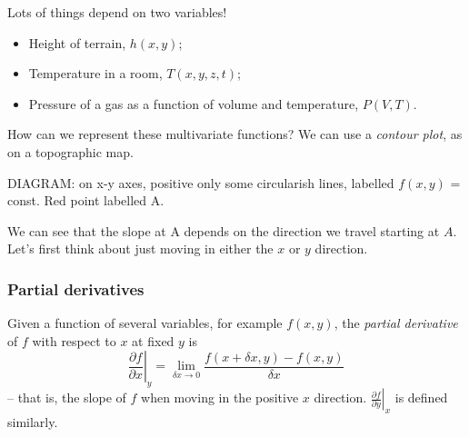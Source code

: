 \documentclass{../template/note}
\begin{document}
    \begin{example}
        Lots of things depend on two variables!
        \begin{itemize}
            \item Height of terrain, \(h(x,y)\);
            \item Temperature in a room, \(T(x, y, z, t)\);
            \item Pressure of a gas as a function of volume and temperature, \(P(V, T)\).
        \end{itemize}
        
        
    \end{example}
    
    How can we represent these multivariate functions? We can use a \emph{contour plot}, as on a topographic map.

    DIAGRAM: on x-y axes, positive only some circularish lines, labelled \(f(x, y)\) = const. Red point labelled A.

    We can see that the slope at A depends on the direction we travel starting at \(A\). Let's first think about just moving in either the \(x\) or \(y\) direction.

    \subsubsection{Partial derivatives}

    \begin{definition}
        Given a function of several variables, for example \(f(x,y)\), the \emph{partial derivative} of \(f\) with respect to \(x\) at fixed \(y\) is
        \[
            \left.\frac{\partial f}{\partial x}\right|_y = \lim_{\delta x \to 0} \frac{f(x+\delta x, y)-f(x, y)}{\delta x}
        \]
        -- that is, the slope of \(f\) when moving in the positive \(x\) direction. \(\left.\frac{\partial f}{\partial y}\right|_x \) is defined similarly.
    \end{definition}
    
\end{document}
